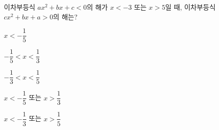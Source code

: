 \hspace*{2mm}\begin{minipage}[t]{\dimexpr\linewidth-2mm\relax}\vspace{0pt}
이차부등식 $ax^2+bx+c<0$의 해가 $x<-3$ 또는 $x>5$일 때, 이차부등식 $cx^2+bx+a>0$의 해는? 
\begin{choicesii}{\rule[-3ex]{0pt}{8ex}$x<-\dfrac{1}{5}$}{\rule[-3ex]{0pt}{8ex}$-\dfrac{1}{5}<x<\dfrac{1}{3}$}{\rule[-3ex]{0pt}{8ex}$-\dfrac{1}{3}<x<\dfrac{1}{5}$}{\rule[-3ex]{0pt}{8ex}$x<-\dfrac{1}{5}$ 또는 $x>\dfrac{1}{3}$}{\rule[-3ex]{0pt}{8ex}$x<-\dfrac{1}{3}$ 또는 $x>\dfrac{1}{5}$}\end{choicesii}\end{minipage}
